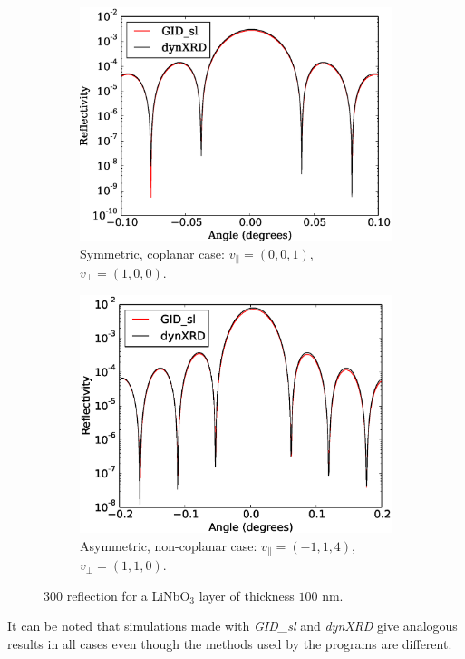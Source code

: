 \documentclass[12pt,oneside,notitlepage,abstracton,a4paper]{scrartcl}
\begin{document}
\begin{figure}[h]
 \centering
 \begin{subfigure}[h]{0.49\textwidth}
  \includegraphics[width=\textwidth]{pics/test9.eps}
  \caption{Symmetric, coplanar case: $v_\parallel=(0, 0, 1)$, $v_\perp=(1,0,0)$.}
  \label{test9}
 \end{subfigure}
 \begin{subfigure}[h]{0.49\textwidth}
  \includegraphics[width=\textwidth]{pics/test11.eps}
  \caption{Asymmetric, non-coplanar case: $v_\parallel=(-1, 1, 4)$,\newline$v_\perp=(1,1,0)$.}
  \label{test11}
 \end{subfigure}
 \caption{$300$ reflection for a LiNbO$ _3$ layer of thickness $100$ nm.}\label{testsLiNbO3}
\end{figure}
It can be noted that simulations made with \textit{GID\_sl} and \textit{dynXRD} give analogous results in all cases even though the methods used by the programs are different.
\end{document}
